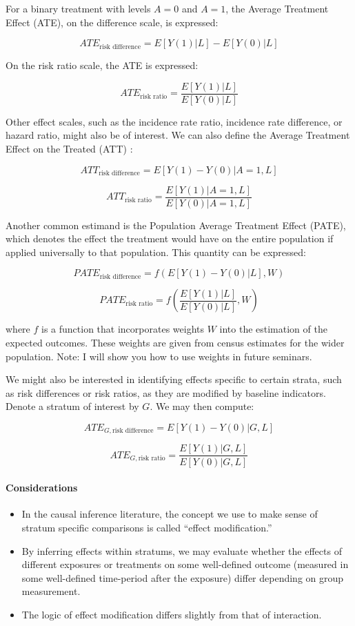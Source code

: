 \documentclass[
  singlecolumn]{article}
\let\oldparagraph\paragraph
\renewcommand{\paragraph}[1]{\oldparagraph{#1}\mbox{}}
\providecommand{\tightlist}{%
  \setlength{\itemsep}{0pt}\setlength{\parskip}{0pt}}\usepackage{longtable,booktabs,array}
\begin{document}
For a binary treatment with levels \(A=0\) and \(A=1\), the Average
Treatment Effect (ATE), on the difference scale, is expressed:

\[ATE_{\text{risk difference}} = E[Y(1)|L] - E[Y(0)|L]\]

On the risk ratio scale, the ATE is expressed:

\[ATE_{\text{risk ratio}} = \frac{E[Y(1)|L]}{E[Y(0)|L]}\]

Other effect scales, such as the incidence rate ratio, incidence rate
difference, or hazard ratio, might also be of interest. We can also
define the Average Treatment Effect on the Treated (ATT) :

\[ATT_{\text{risk difference}} = E[Y(1) - Y(0)|A=1,L]\]

\[ATT_{\text{risk ratio}} = \frac{E[Y(1)|A=1,L]}{E[Y(0)|A=1, L]}\]

Another common estimand is the Population Average Treatment Effect
(PATE), which denotes the effect the treatment would have on the entire
population if applied universally to that population. This quantity can
be expressed:

\[PATE_{\text{risk difference}} = f(E[Y(1) - Y(0)|L], W)\]

\[PATE_{\text{risk ratio}} = f\left(\frac{E[Y(1)|L]}{E[Y(0)|L]}, W\right)\]

where \(f\) is a function that incorporates weights \(W\) into the
estimation of the expected outcomes. These weights are given from census
estimates for the wider population. Note: I will show you how to use
weights in future seminars.

We might also be interested in identifying effects specific to certain
strata, such as risk differences or risk ratios, as they are modified by
baseline indicators. Denote a stratum of interest by \(G\). We may then
compute:

\[ATE_{G,\text{risk difference}} = E[Y(1) - Y(0)|G, L]\]

\[ATE_{G,\text{risk ratio}} = \frac{E[Y(1)|G, L]}{E[Y(0)|G, L]}\]

\hypertarget{considerations}{%
\paragraph{Considerations}\label{considerations}}

\begin{itemize}
\tightlist
\item
  In the causal inference literature, the concept we use to make sense
  of stratum specific comparisons is called ``effect modification.''
\item
  By inferring effects within stratums, we may evaluate whether the
  effects of different exposures or treatments on some well-defined
  outcome (measured in some well-defined time-period after the exposure)
  differ depending on group measurement.
\item
  The logic of effect modification differs slightly from that of
  interaction.
\end{itemize}
\end{document}
